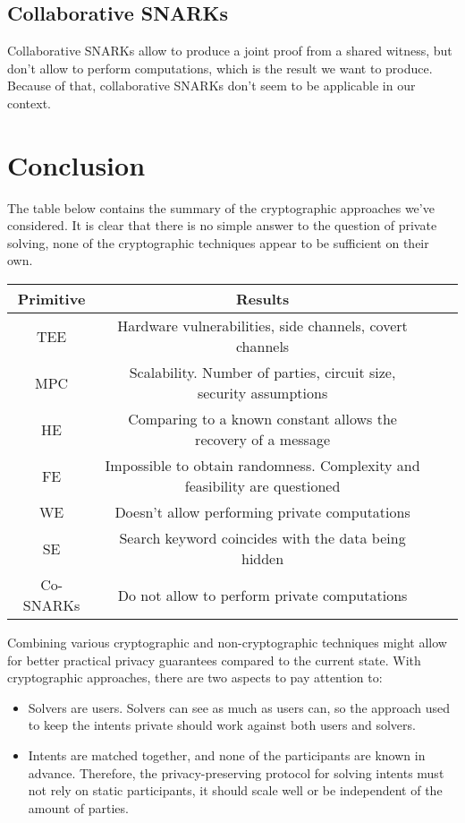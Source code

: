 \documentclass[
    9pt,            %
    report,        %
    affiltop,       %
]{art}
\begin{document}
\subsection{Collaborative SNARKs}

Collaborative SNARKs allow to produce a joint proof from a shared witness, but don't allow to perform computations, which is the result we want to produce. Because of that, collaborative SNARKs don't seem to be applicable in our context.

\section{Conclusion}

The table below contains the summary of the cryptographic approaches we've considered. It is clear that there is no simple answer to the question of private solving, none of the cryptographic techniques appear to be sufficient on their own.

\begin{center}
\begin{tabular}{ |c|c|c|c| } 
\hline
 Primitive & Results \\
\hline
\hline
TEE & Hardware vulnerabilities, side channels, covert channels \\ 
\hline
MPC & Scalability. Number of parties, circuit size, security assumptions \\ 
\hline
HE & Comparing to a known constant allows the recovery of a message\\ 
\hline
FE & Impossible to obtain randomness. Complexity and feasibility are questioned \\ 
\hline
WE & Doesn't allow performing private computations \\ 
\hline
SE & Search keyword coincides with the data being hidden\\ 
\hline
Co-SNARKs & Do not allow to perform private computations \\ 

\hline
\end{tabular}
\end{center}

Combining various cryptographic and non-cryptographic techniques might allow for better practical privacy guarantees compared to the current state. With cryptographic approaches, there are two aspects to pay attention to:
\begin{itemize}
    \item Solvers are users. Solvers can see as much as users can, so the approach used to keep the intents private should work against both users and solvers.
    \item Intents are matched together, and none of the participants are known in advance. Therefore, the privacy-preserving protocol for solving intents must not rely on static participants, it should scale well or be independent of the amount of parties.
\end{itemize}
\end{document}
